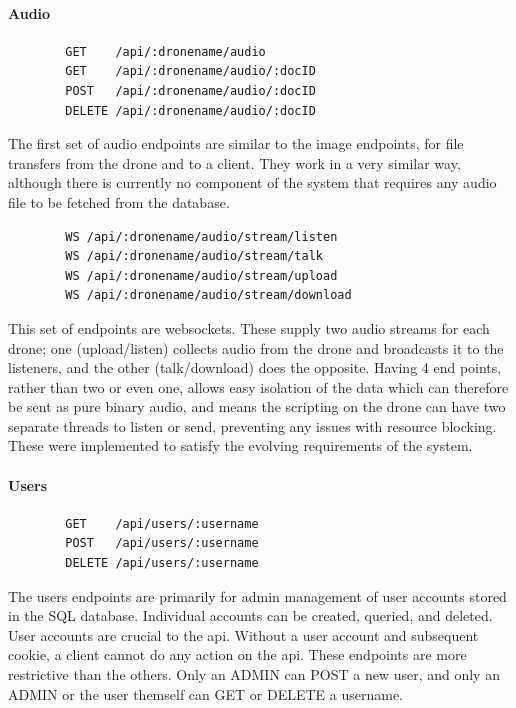 \documentclass{article}
\begin{document}
\paragraph{Audio}
\begin{center}
	\begin{lstlisting}
		GET    /api/:dronename/audio
		GET    /api/:dronename/audio/:docID
		POST   /api/:dronename/audio/:docID
		DELETE /api/:dronename/audio/:docID
	\end{lstlisting}
\end{center}
The first set of audio endpoints are similar to the image endpoints, for file transfers from the drone and to a client. They work in a very similar way, although there is currently no component of the system that requires any audio file to be fetched from the database. 
\begin{center}	
	\begin{lstlisting}
		WS /api/:dronename/audio/stream/listen
		WS /api/:dronename/audio/stream/talk
		WS /api/:dronename/audio/stream/upload
		WS /api/:dronename/audio/stream/download
	\end{lstlisting}
\end{center}
This set of endpoints are websockets. These supply two audio streams for each drone; one (upload/listen) collects audio from the drone and broadcasts it to the listeners, and the other (talk/download) does the opposite. Having 4 end points, rather than two or even one, allows easy isolation of the data which can therefore be sent as pure binary audio, and means the scripting on the drone can have two separate threads to listen or send, preventing any issues with resource blocking. These were implemented to satisfy the evolving requirements of the system. 


\paragraph{Users}
\begin{center}
	\begin{lstlisting}
		GET    /api/users/:username
		POST   /api/users/:username
		DELETE /api/users/:username
	\end{lstlisting}
\end{center}
The users endpoints are primarily for admin management of user accounts stored in the SQL database. Individual accounts can be created, queried, and deleted. User accounts are crucial to the api. Without a user account and subsequent cookie, a client cannot do any action on the api. These endpoints are more restrictive than the others. Only an ADMIN can POST a new user, and only an ADMIN or the user themself can GET or DELETE a username. 
\end{document}
